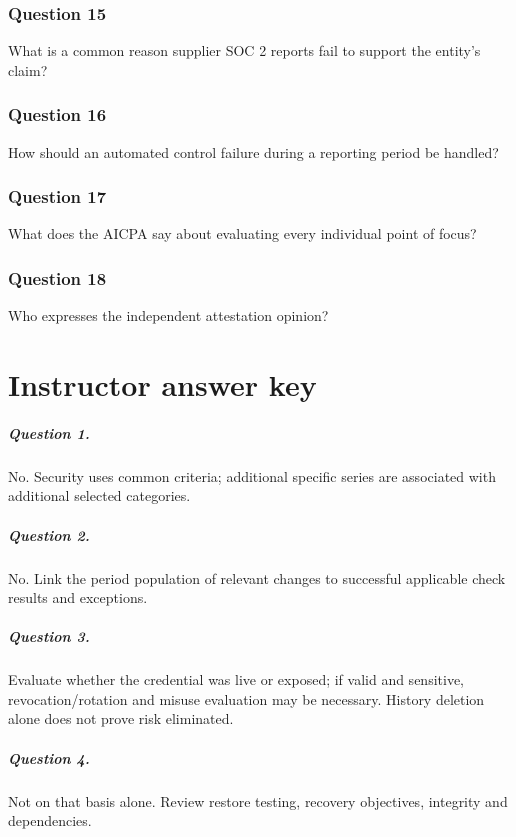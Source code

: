 \documentclass[10pt,oneside]{report}
\begin{document}
\subsection*{Question 15}
What is a common reason supplier SOC 2 reports fail to support the entity's claim?

\subsection*{Question 16}
How should an automated control failure during a reporting period be handled?

\subsection*{Question 17}
What does the AICPA say about evaluating every individual point of focus?

\subsection*{Question 18}
Who expresses the independent attestation opinion?

\chapter{Instructor answer key}
\paragraph{Question 1.} No. Security uses common criteria; additional specific series are associated with additional selected categories.

\paragraph{Question 2.} No. Link the period population of relevant changes to successful applicable check results and exceptions.

\paragraph{Question 3.} Evaluate whether the credential was live or exposed; if valid and sensitive, revocation/rotation and misuse evaluation may be necessary. History deletion alone does not prove risk eliminated.

\paragraph{Question 4.} Not on that basis alone. Review restore testing, recovery objectives, integrity and dependencies.
\end{document}
